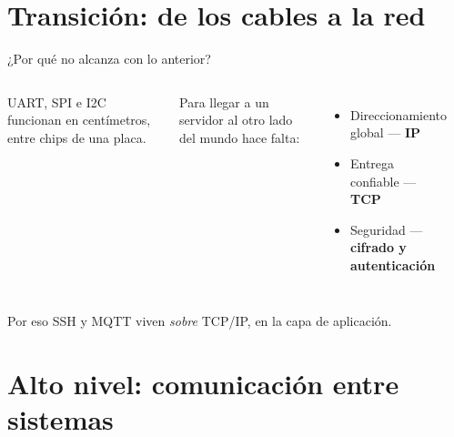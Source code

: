 \documentclass[aspectratio=169,11pt]{beamer}
\begin{document}
\section{Transición: de los cables a la red}

\begin{frame}{¿Por qué no alcanza con lo anterior?}
\begin{columns}[c]
UART, SPI e I2C funcionan en \alert{centímetros}, entre chips de una placa.
\vspace{0.6em}

Para llegar a un servidor al otro lado del mundo hace falta:
\begin{itemize}\small
  \item Direccionamiento global — \textbf{IP}
  \item Entrega confiable — \textbf{TCP}
  \item Seguridad — \textbf{cifrado y autenticación}
\end{itemize}
\begin{center}
\end{center}
\end{columns}
\vspace{0.6em}
{\footnotesize Por eso SSH y MQTT viven \emph{sobre} TCP/IP, en la capa de aplicación.}
\end{frame}

\section{Alto nivel: comunicación entre sistemas}
\end{document}
